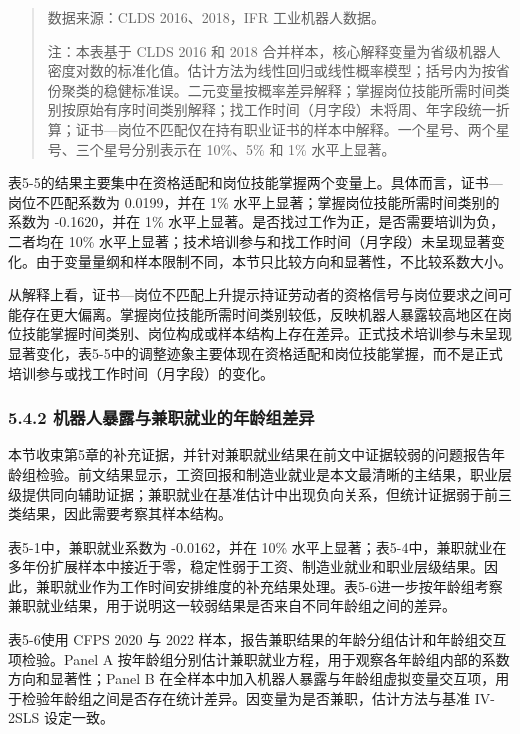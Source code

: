 \begin{quote}
数据来源：CLDS 2016、2018，IFR 工业机器人数据。

注：本表基于 CLDS 2016 和 2018 合并样本，核心解释变量为省级机器人密度对数的标准化值。估计方法为线性回归或线性概率模型；括号内为按省份聚类的稳健标准误。二元变量按概率差异解释；掌握岗位技能所需时间类别按原始有序时间类别解释；找工作时间（月字段）未将周、年字段统一折算；证书---岗位不匹配仅在持有职业证书的样本中解释。一个星号、两个星号、三个星号分别表示在 10\%、5\% 和 1\% 水平上显著。
\end{quote}

表5-5的结果主要集中在资格适配和岗位技能掌握两个变量上。具体而言，证书---岗位不匹配系数为 0.0199，并在 1\% 水平上显著；掌握岗位技能所需时间类别的系数为 -0.1620，并在 1\% 水平上显著。是否找过工作为正，是否需要培训为负，二者均在 10\% 水平上显著；技术培训参与和找工作时间（月字段）未呈现显著变化。由于变量量纲和样本限制不同，本节只比较方向和显著性，不比较系数大小。

从解释上看，证书---岗位不匹配上升提示持证劳动者的资格信号与岗位要求之间可能存在更大偏离。掌握岗位技能所需时间类别较低，反映机器人暴露较高地区在岗位技能掌握时间类别、岗位构成或样本结构上存在差异。正式技术培训参与未呈现显著变化，表5-5中的调整迹象主要体现在资格适配和岗位技能掌握，而不是正式培训参与或找工作时间（月字段）的变化。

\subsubsection{5.4.2 机器人暴露与兼职就业的年龄组差异}\label{ux673aux5668ux4ebaux66b4ux9732ux4e0eux517cux804cux5c31ux4e1aux7684ux5e74ux9f84ux7ec4ux5deeux5f02}

本节收束第5章的补充证据，并针对兼职就业结果在前文中证据较弱的问题报告年龄组检验。前文结果显示，工资回报和制造业就业是本文最清晰的主结果，职业层级提供同向辅助证据；兼职就业在基准估计中出现负向关系，但统计证据弱于前三类结果，因此需要考察其样本结构。

表5-1中，兼职就业系数为 -0.0162，并在 10\% 水平上显著；表5-4中，兼职就业在多年份扩展样本中接近于零，稳定性弱于工资、制造业就业和职业层级结果。因此，兼职就业作为工作时间安排维度的补充结果处理。表5-6进一步按年龄组考察兼职就业结果，用于说明这一较弱结果是否来自不同年龄组之间的差异。

表5-6使用 CFPS 2020 与 2022 样本，报告兼职结果的年龄分组估计和年龄组交互项检验。Panel A 按年龄组分别估计兼职就业方程，用于观察各年龄组内部的系数方向和显著性；Panel B 在全样本中加入机器人暴露与年龄组虚拟变量交互项，用于检验年龄组之间是否存在统计差异。因变量为是否兼职，估计方法与基准 IV-2SLS 设定一致。

